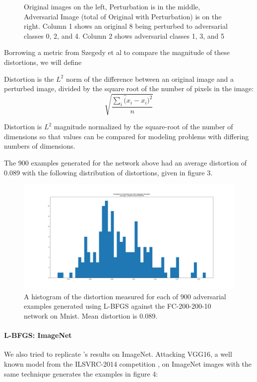 \begin{figure}[H]
\caption{Original images on the left, Perturbation is in the middle, Adversarial Image (total of Original with Perturbation) is on the right. Column 1 shows an original 8 being perturbed to adversarial classes 0, 2, and 4. Column 2 shows adversarial classes 1, 3, and 5}
\end{figure}
Borrowing a metric from Szegedy et al to compare the magnitude of these distortions, we will define
\begin{definition}{Distortion is the $L^2$ norm of the difference between an original image and a perturbed image, divided by the square root of the number of pixels in the image: }
\[\sqrt{\dfrac{\sum_i \hat (x_i - x_i)^2}{n}}\]
\end{definition}
Distortion is $L^2$ magnitude normalized by the square-root of the number of dimensions so that values can be compared for modeling problems with differing numbers of dimensions. 

The 900 examples generated for the network above had an average distortion of 0.089 with the following distribution of distortions, given in figure 3.

\begin{figure}[H]
\label{lbfgsh}
\includegraphics[trim=200 80 100 100, clip, width=16cm]{c1_figures/FC200-200-10-distortion_hist.png}
\caption{A histogram of the distortion measured for each of 900 adversarial examples generated using L-BFGS against the FC-200-200-10 network on Mnist. Mean distortion is 0.089.}
\end{figure}

\paragraph{L-BFGS: ImageNet}
\label{lbfgs-s}
We also tried to replicate \cite{szegedy2013}'s results on ImageNet. Attacking VGG16, a well known model from the ILSVRC-2014 competition \cite{simonyan2014very}, on ImageNet images with the same technique generates the examples in figure 4: 

